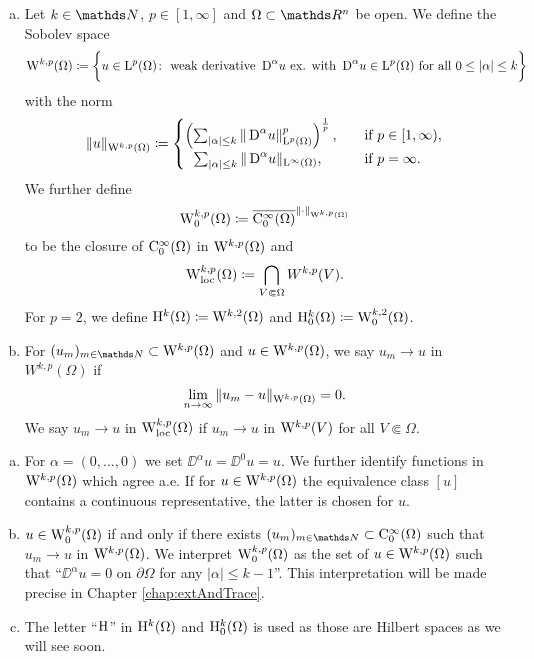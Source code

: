 \begin{defn}
  \label{defn:sobolevSpace}
  \begin{enumerate}[a)]
    \item Let $k \in \N$, $p \in [1,\infty]$ and $\Omega \subset \R^n$ be open. 
      We define the Sobolev space
      $$
      \mathrm{W}^{k,p}(\Omega) \coloneqq \bigg\{u \in \mathrm{L}^p(\Omega) \colon \text{ weak derivative } \,{\operatorname{D}}^\alpha u \text{ ex. with } \,{\operatorname{D}}^\alpha u \in \mathrm{L}^p(\Omega) \text{ for all } 0 \leq |\alpha| \leq k \bigg\}
      $$
      with the norm
      $$
      \|u\|_{\mathrm{W}^{k,p}(\Omega)} \coloneqq 
      \begin{cases}
        \left( \sum_{|\alpha| \leq k} \|\,{\operatorname{D}}^\alpha u\|_{\mathrm{L}^p(\Omega)}^p \right)^{\frac{1}{p}}, &\quad\text{if } p \in [1,\infty), \\
          \hphantom{\big(}\sum_{|\alpha| \leq k} \|\,{\operatorname{D}}^\alpha u\|_{\mathrm{L}^\infty(\Omega)}, &\quad\text{if } p = \infty.
      \end{cases}
      $$
      We further define
      $$
      \mathrm{W}_0^{k,p}(\Omega) \coloneqq \overline{\mathrm{C}_0^\infty(\Omega)}^{\|\cdot\|_{\mathrm{W}^{k,p}(\Omega)}}
      $$
      to be the closure of $\mathrm{C}_0^\infty(\Omega)$ in $\mathrm{W}^{k,p}(\Omega)$ and
      $$
      \mathrm{W}_{\operatorname{loc}}^{k,p}(\Omega) \coloneqq \bigcap_{V \Subset \Omega} W^{k,p}(V).
      $$
      For $p = 2$, we define $\mathrm{H}^k(\Omega) \coloneqq \mathrm{W}^{k,2}(\Omega)$ and $\mathrm{H}_0^k(\Omega) \coloneqq \mathrm{W}_0^{k,2}(\Omega)$.
    \item For $(u_m)_{m \in \N} \subset \WW^{k,p}(\Omega)$ and $u \in \mathrm{W}^{k,p}(\Omega)$, we say $u_m \to u$ in $W^{k,p}(\Omega)$ if $$\lim_{n \to \infty} \|u_m - u\|_{\mathrm{W}^{k,p}(\Omega)} = 0.$$  
      We say $u_m \to u$ in $\mathrm{W}_{\operatorname{loc}}^{k,p}(\Omega)$ if $u_m \to u$ in $\mathrm{W}^{k,p}(V)$ for all $V \Subset \Omega$.
  \end{enumerate}
\end{defn}

\begin{rem}
  \begin{enumerate}[a)]
    \item For $\alpha = (0,\dots,0)$ we set $\DD^\alpha u = \DD^0 u = u$.
      We further identify functions in $\mathrm{W}^{k,p}(\Omega)$ which agree a.e.
      If for $u \in \mathrm{W}^{k,p}(\Omega)$ the equivalence class $[u]$ contains a continuous representative, the latter is chosen for $u$.
    \item $u \in \mathrm{W}_0^{k,p}(\Omega)$ if and only if there exists $(u_m)_{m \in \N} \subset \CC_0^\infty(\Omega)$ such that $u_m \to u$ in $\mathrm{W}^{k,p}(\Omega)$.
      We interpret $\mathrm{W}_0^{k,p}(\Omega)$ as the set of $u \in \mathrm{W}^{k,p}(\Omega)$ such that ``$\DD^\alpha u = 0$ on $\partial \Omega$ for any $|\alpha| \leq k - 1$''.
      This interpretation will be made precise in Chapter \ref{chap:extAndTrace}.
    \item The letter ``$\mathrm{H}$'' in $\mathrm{H}^k(\Omega)$ and $\mathrm{H}_0^k(\Omega)$ is used as those are Hilbert spaces as we will see soon.
  \end{enumerate}
\end{rem}

